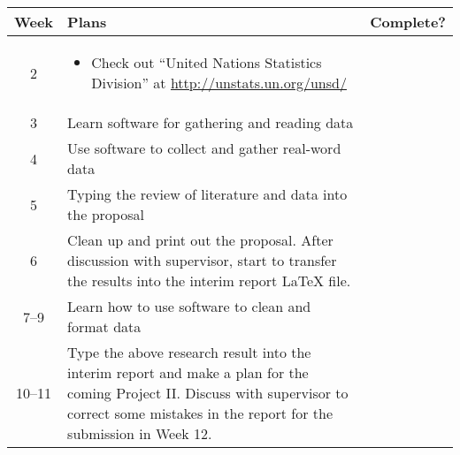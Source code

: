 \documentclass[a4paper,12pt]{article}
\begin{document}

\begin{center}
  \begin{tabular}{|c|p{10cm}|c|}
    \hline
    Week & \hfil Plans & Complete?\\
    \hline
    2 &
    \begin{itemize}
    \item Check out ``United Nations Statistics Division'' at
      \url{http://unstats.un.org/unsd/}
    \end{itemize} &
    \\
    3 & Learn software for gathering and reading data &
    \\
    4 & Use software to collect and gather real-word data &
    \\
    5 & Typing the review of literature and data into the proposal &
    \\
    6 & Clean up and print out the proposal.  After discussion with
    supervisor, start to transfer the results into the interim report
    \LaTeX{} file. &
    \\
    7--9 & Learn how to use software to clean and format data &
    \\
    10--11 & Type the above research result into the interim report
    and make a plan for the coming Project II.  Discuss with
    supervisor to correct some mistakes in the report for the
    submission in Week 12. &
    \\
    \hline
  \end{tabular}
\end{center}




%
%
\end{document}
